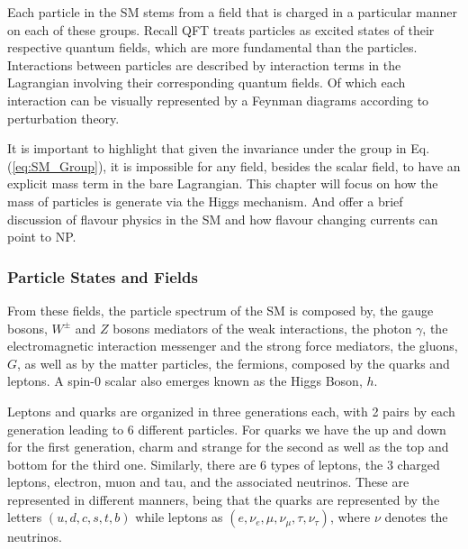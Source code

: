 Each particle in the SM stems from a field that is charged in a particular manner on each of these groups.  
%
Recall QFT treats particles as excited states of their respective quantum fields, which are more fundamental than the particles. 
%
Interactions between particles are described by interaction terms in the Lagrangian involving their corresponding quantum fields.
%
Of which each interaction can be visually represented by a Feynman diagrams according to perturbation theory. 

It is important to highlight that given the invariance under the group in Eq.\,(\ref{eq:SM_Group}), it is impossible for any field, besides the scalar field, to have an explicit mass term in the bare Lagrangian.
%
This chapter will focus on how the mass of particles is generate via the Higgs mechanism.
%
And offer a brief discussion of flavour physics in the SM and how flavour changing currents can point to NP. 


\subsubsection{Particle States and Fields}

From these fields, the particle spectrum of the SM is composed by, the gauge bosons, $W^\pm$ and $Z$ bosons mediators of the weak interactions, the photon $\gamma$, the electromagnetic interaction messenger and the strong force mediators, the gluons, $G$, as well as by the matter particles, the fermions, composed by the quarks and leptons. A spin-0 scalar also emerges known as the Higgs Boson, $h$. 

Leptons and quarks are organized in three generations each, with 2 pairs by each generation leading to 6 different particles. 
%
For quarks we have the up and down for the first generation, charm and strange for the second as well as the top and bottom for the third one. 
%
Similarly, there are 6 types of leptons, the 3 charged leptons, electron, muon and tau, and the associated neutrinos. These are represented in different manners, being that the quarks are represented by the letters $(u,d,c,s,t,b)$ while leptons as $(e,\nu_{e},\mu,\nu_{\mu},\tau,\nu_{\tau})$, where $\nu$ denotes the neutrinos. 

